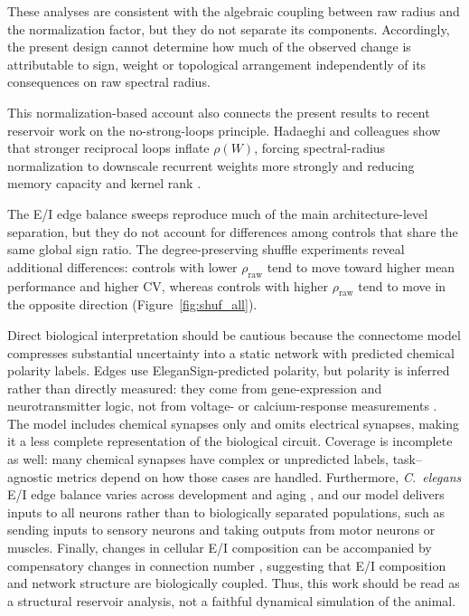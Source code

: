\documentclass[a4paper,fleqn]{style_neural_networks/cas-dc}
\let\parencite\citep
\begin{document}
These analyses are consistent with the algebraic coupling between raw radius and the normalization factor, but they do not separate its components. Accordingly, the present design cannot determine how much of the observed change is attributable to sign, weight or topological arrangement independently of its consequences on raw spectral radius.

This normalization-based account also connects the present results to recent reservoir work on the no-strong-loops principle. Hadaeghi and colleagues show that stronger reciprocal loops inflate \(\rho(W)\), forcing spectral-radius normalization to downscale recurrent weights more strongly and reducing memory capacity and kernel rank \parencite{hadaeghi_no_strong_loops_2025}.

The E/I edge balance sweeps reproduce much of the main architecture-level separation, but they do not account for differences among controls that share the same global sign ratio. The degree-preserving shuffle experiments reveal additional differences: controls with lower \(\rho_{\mathrm{raw}}\) tend to move toward higher mean performance and higher CV, whereas controls with higher \(\rho_{\mathrm{raw}}\) tend to move in the opposite direction (Figure~\ref{fig:shuf_all}).

Direct biological interpretation should be cautious because the connectome model compresses substantial uncertainty into a static network with predicted chemical polarity labels. Edges use EleganSign-predicted polarity, but polarity is inferred rather than directly measured: they come from gene-expression and neurotransmitter logic, not from voltage- or calcium-response measurements \parencite{fenyves_szilágyi_zsolt_vassy_csaba_2020}. The model includes chemical synapses only and omits electrical synapses, making it a less complete representation of the biological circuit. Coverage is incomplete as well: many chemical synapses have complex or unpredicted labels, task--agnostic metrics depend on how those cases are handled. Furthermore, \textit{C.\ elegans} E/I edge balance varies across development and aging \parencite{wirak_florman_alkema_connor_gabel_2022,tanis_bellemer_moresco_forbush_koelle_2009}, and our model delivers inputs to all neurons rather than to biologically separated populations, such as sending inputs to sensory neurons and taking outputs from motor neurons or muscles. Finally, changes in cellular E/I composition can be accompanied by compensatory changes in connection number \parencite{sukenik_connection_numbers_2021}, suggesting that E/I composition and network structure are biologically coupled. Thus, this work should be read as a structural reservoir analysis, not a faithful dynamical simulation of the animal.
\end{document}
